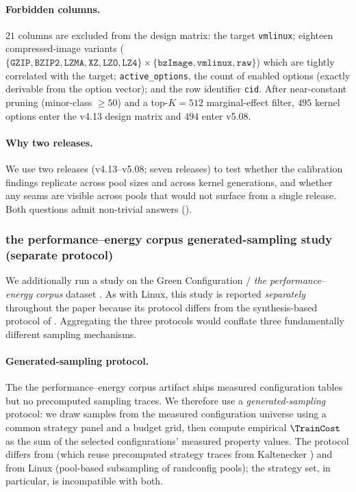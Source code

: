 \paragraph*{Forbidden columns.}
$21$ columns are excluded from the design matrix: the target
\texttt{vmlinux}; eighteen compressed-image variants
($\{\texttt{GZIP},\texttt{BZIP2},\texttt{LZMA},\texttt{XZ},\texttt{LZO},\texttt{LZ4}\}\times\{\texttt{bzImage},\texttt{vmlinux},\texttt{raw}\}$)
which are tightly correlated with the target; \texttt{active\_options},
the count of enabled options (exactly derivable from the option
vector); and the row identifier \texttt{cid}. After near-constant
pruning (minor-class $\geq 50$) and a top-$K=512$ marginal-effect
filter, $495$ kernel options enter the v4.13 design matrix and $494$
enter v5.08.

\paragraph*{Why two releases.}
We use two releases (v4.13--v5.08; seven releases) to test whether the
calibration findings replicate across pool sizes and across kernel
generations, and whether any seams are visible across pools that
would not surface from a single release. Both questions admit
non-trivial answers ().

\subsubsection{the performance--energy corpus generated-sampling study (separate protocol)}
\label{subsubsec:twins-protocol}

We additionally run a study on the Green Configuration /
\emph{the performance--energy corpus} dataset . As with Linux, this
study is reported \emph{separately} throughout the paper because its
protocol differs from the synthesis-based protocol of \StudyReplication. Aggregating the three protocols would conflate three
fundamentally different sampling mechanisms.

\paragraph*{Generated-sampling protocol.}
The the performance--energy corpus artifact ships measured configuration tables
but no precomputed sampling traces. We therefore use a
\emph{generated-sampling} protocol: we draw samples from the measured
configuration universe using a common strategy panel and a budget
grid, then compute empirical $\TrainCost$ as the sum of the selected
configurations' measured property values. The protocol differs from
\StudyReplication (which reuse precomputed strategy traces from
Kaltenecker \etal) and from Linux (pool-based subsampling of
randconfig pools); the strategy set, in particular, is incompatible
with both.

